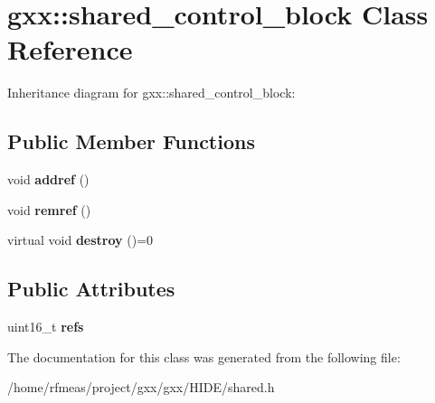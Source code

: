 \hypertarget{classgxx_1_1shared__control__block}{}\section{gxx\+:\+:shared\+\_\+control\+\_\+block Class Reference}
\label{classgxx_1_1shared__control__block}


Inheritance diagram for gxx\+:\+:shared\+\_\+control\+\_\+block\+:
\subsection*{Public Member Functions}
\begin{DoxyCompactItemize}
\item 
void {\bfseries addref} ()\hypertarget{classgxx_1_1shared__control__block_a85b5fb2f108e0f1ba51fea6065ec1e42}{}\label{classgxx_1_1shared__control__block_a85b5fb2f108e0f1ba51fea6065ec1e42}

\item 
void {\bfseries remref} ()\hypertarget{classgxx_1_1shared__control__block_a250fb490552a63c7e31e2eb26a435424}{}\label{classgxx_1_1shared__control__block_a250fb490552a63c7e31e2eb26a435424}

\item 
virtual void {\bfseries destroy} ()=0\hypertarget{classgxx_1_1shared__control__block_a53a030dfdf37e528d374b602d6000e82}{}\label{classgxx_1_1shared__control__block_a53a030dfdf37e528d374b602d6000e82}

\end{DoxyCompactItemize}
\subsection*{Public Attributes}
\begin{DoxyCompactItemize}
\item 
uint16\+\_\+t {\bfseries refs}\hypertarget{classgxx_1_1shared__control__block_acc385a3f14df03a6d7cf682821fd9d2a}{}\label{classgxx_1_1shared__control__block_acc385a3f14df03a6d7cf682821fd9d2a}

\end{DoxyCompactItemize}


The documentation for this class was generated from the following file\+:\begin{DoxyCompactItemize}
\item 
/home/rfmeas/project/gxx/gxx/\+H\+I\+D\+E/shared.\+h\end{DoxyCompactItemize}
